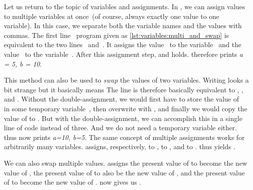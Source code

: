 %
\label{sec:multiAssignments}%
%
%
%
%
Let us return to the topic of variables and assignments.
In \python, we can assign values to multiple variables at once~(of course, always exactly one value to one variable).
In this case, we separate both the variable names and the values with commas.
The first line~\pythonIdx{,} program  given as \cref{lst:variables:multi_and_swap} is equivalent to the two lines~ and~.
It assigns the value~ to the variable~ and the value~ to the variable~.
After this assignment step,  and  holds.
 therefore prints \textit{a = 5, b = 10}.

This method can also be used to \emph{swap} the values of two variables.
Writing  looks a bit strange but it basically means 
The line is therefore basically equivalent to , , and .
Without the double-assignment, we would first have to store the value of~ in some temporary variable~, then overwrite  with , and finally we would copy the value of  to .
But with the double-assignment, we can accomplish this in a single line of code instead of three.
And we do not need a temporary variable either.
 thus now prints \textit{a=10, b=5}.%
%
%
%
The same concept of multiple assignments works for arbitrarily many variables.
 assigns, respectively,  to ,  to , and  to .
 thus yields .

We can also swap multiple values.
 assigns the present value of  to become the new value of , the present value of  to also be the new value of , and the present value of  to become the new value of .
 now gives us .
%
\FloatBarrier%
\endhsection%
%
